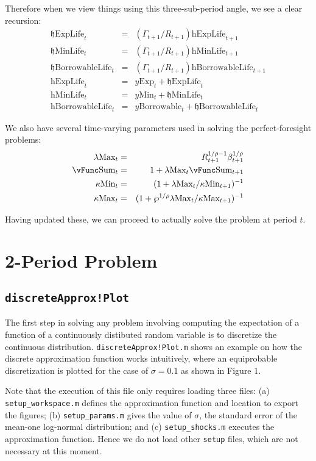 \documentclass[titlepage,abstract]{\econtex}
\providecommand{\lambdaMax}{\lambda\text{Max}}
\providecommand{\kappaMax}{\kappa\text{Max}}
\providecommand{\kappaMin}{\kappa\text{Min}}
\providecommand{\vSum}{\vFunc\text{Sum}}
\providecommand{\pUnem}{\wp}
\providecommand{\hExpLife}{\mathrm{h}\text{ExpLife}}
\providecommand{\hMinLife}{\mathrm{h}\text{MinLife}}
\providecommand{\hBorrowableLife}{\mathrm{h}\text{BorrowableLife}}
\providecommand{\hEndExpLife}{\mathfrak{h}\text{ExpLife}}
\providecommand{\hEndMinLife}{\mathfrak{h}\text{MinLife}}
\providecommand{\hEndBorrowableLife}{\mathfrak{h}\text{BorrowableLife}}
\providecommand{\yMin}{y\text{Min}}
\providecommand{\yBorrowable}{y\text{Borrowable}}
\providecommand{\yExp}{y\text{Exp}}
\begin{document}
Therefore when we view things using this three-sub-period angle, we see a clear recursion:
\begin{eqnarray}
          \hEndExpLife_{t} &=& (\Gamma_{t+1}/R_{t+1}) \hExpLife_{t+1} \\
          \hEndMinLife_{t} &=& (\Gamma_{t+1}/R_{t+1}) \hMinLife_{t+1} \\
          \hEndBorrowableLife_{t} &=& (\Gamma_{t+1}/R_{t+1}) \hBorrowableLife_{t+1} \\
          \hExpLife_{t} &=& \yExp_{t} +\hEndExpLife_{t} \\
          \hMinLife_{t} &=& \yMin_{t} +\hEndMinLife_{t} \\
          \hBorrowableLife_{t} &=& \yBorrowable_{t} +\hEndBorrowableLife_{t}
\end{eqnarray}

We also have several time-varying parameters used in solving the perfect-foresight problems:
          \begin{eqnarray}
          \lambdaMax_{t} &=& R_{t+1}^{1/\rho-1}\beta_{t+1}^{1/\rho} \\
          \vSum_{t} &=& 1+ \lambdaMax_{t} \vSum_{t+1} \\
          \kappaMin_{t} &=& (1+\lambdaMax_{t}/\kappaMin_{t+1})^{-1} \\
          \kappaMax_{t} &=& (1+\pUnem^{1/\rho}\lambdaMax_{t}/\kappaMax_{t+1})^{-1}
          \end{eqnarray}

Having updated these, we can proceed to actually solve the problem at period $t$.
          
\section{2-Period Problem}
\subsection{\texttt{discreteApprox!Plot}}
The first step in solving any problem involving computing the expectation of a function of a continuously distibuted random variable is to discretize the continuous distribution. \texttt{discreteApprox!Plot.m} shows an example on how the discrete approximation function works intuitively, where an equiprobable discretization is plotted for the case of $\sigma= 0.1$ as shown in Figure $1$.

Note that the execution of this file only requires loading three files: (a) \texttt{setup\_workspace.m} defines the approximation function and location to export the figures; (b) \texttt{setup\_params.m} gives the value of $\sigma$, the standard error of the mean-one log-normal distribution; and (c) \texttt{setup\_shocks.m} executes the approximation function. Hence we do not load other \texttt{setup} files, which are not necessary at this moment.
\end{document}
